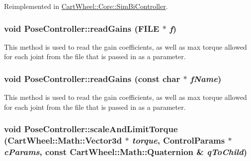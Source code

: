 Reimplemented in \hyperlink{classCartWheel_1_1Core_1_1SimBiController_a9508198fc8cc2f2ceb9c1edef8ed0a45}{CartWheel::Core::SimBiController}.

\hypertarget{classCartWheel_1_1Core_1_1PoseController_a6070385fa69f77349735504fafcaae73}{
\subsubsection[{readGains}]{\setlength{\rightskip}{0pt plus 5cm}void PoseController::readGains (FILE $\ast$ {\em f})}}
\label{classCartWheel_1_1Core_1_1PoseController_a6070385fa69f77349735504fafcaae73}
This method is used to read the gain coefficients, as well as max torque allowed for each joint from the file that is passed in as a parameter. \hypertarget{classCartWheel_1_1Core_1_1PoseController_ae70268cf3e1ef0d0d1b0f9585b2221e3}{
\subsubsection[{readGains}]{\setlength{\rightskip}{0pt plus 5cm}void PoseController::readGains (const char $\ast$ {\em fName})}}
\label{classCartWheel_1_1Core_1_1PoseController_ae70268cf3e1ef0d0d1b0f9585b2221e3}
This method is used to read the gain coefficients, as well as max torque allowed for each joint from the file that is passed in as a parameter. \hypertarget{classCartWheel_1_1Core_1_1PoseController_aff8a23377cd8e222686cd762be41b19a}{
\subsubsection[{scaleAndLimitTorque}]{\setlength{\rightskip}{0pt plus 5cm}void PoseController::scaleAndLimitTorque ({\bf CartWheel::Math::Vector3d} $\ast$ {\em torque}, \/  {\bf ControlParams} $\ast$ {\em cParams}, \/  const {\bf CartWheel::Math::Quaternion} \& {\em qToChild})}}
